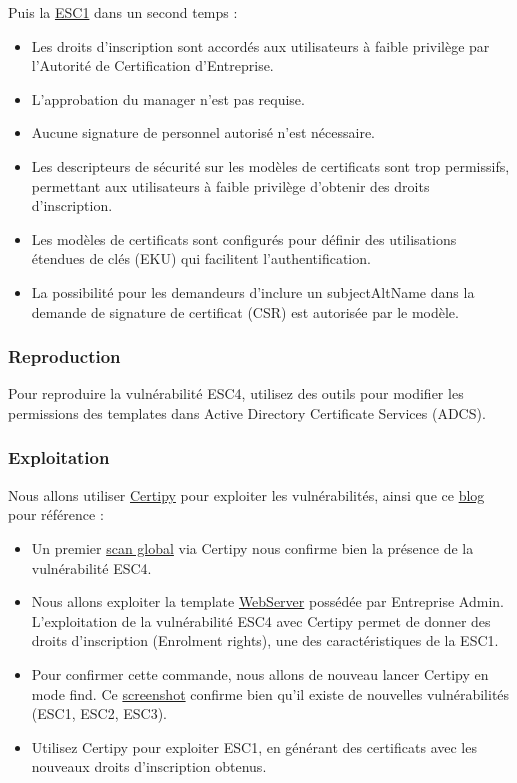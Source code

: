 \documentclass{article}
\begin{document}
Puis la \href{https://book.hacktricks.xyz/windows-hardening/active-directory-methodology/ad-certificates/domain-escalation}{ESC1} dans un second temps :
\begin{itemize}
    \item Les droits d'inscription sont accordés aux utilisateurs à faible privilège par l'Autorité de Certification d'Entreprise.
    \item L'approbation du manager n'est pas requise.
    \item Aucune signature de personnel autorisé n'est nécessaire.
    \item Les descripteurs de sécurité sur les modèles de certificats sont trop permissifs, permettant aux utilisateurs à faible privilège d'obtenir des droits d'inscription.
    \item Les modèles de certificats sont configurés pour définir des utilisations étendues de clés (EKU) qui facilitent l'authentification.
    \item La possibilité pour les demandeurs d'inclure un subjectAltName dans la demande de signature de certificat (CSR) est autorisée par le modèle.
\end{itemize}

\subsubsection{Reproduction}
Pour reproduire la vulnérabilité ESC4, utilisez des outils pour modifier les permissions des templates dans Active Directory Certificate Services (ADCS).

\subsubsection{Exploitation}
Nous allons utiliser \href{https://github.com/ly4k/Certipy}{Certipy} pour exploiter les vulnérabilités, ainsi que ce \href{https://www.beyondtrust.com/blog/entry/esc4-attacks}{blog} pour référence :
\begin{itemize}
    \item Un premier \href{https://github.com/MikeHorn-git/ADSecOps/blob/main/assets/text/certipy_recon.txt}{scan global} via Certipy nous confirme bien la présence de la vulnérabilité ESC4.
    \item Nous allons exploiter la template \href{https://github.com/MikeHorn-git/ADSecOps/blob/main/assets/text/certipy_webserver.txt}{WebServer} possédée par Entreprise Admin. L'exploitation de la vulnérabilité ESC4 avec Certipy permet de donner des droits d'inscription (Enrolment rights), une des caractéristiques de la ESC1.
    \item Pour confirmer cette commande, nous allons de nouveau lancer Certipy en mode find. Ce \href{https://github.com/MikeHorn-git/ADSecOps/blob/main/assets/pictures/certipy_confirm.png}{screenshot} confirme bien qu'il existe de nouvelles vulnérabilités (ESC1, ESC2, ESC3).
    \item Utilisez Certipy pour exploiter ESC1, en générant des certificats avec les nouveaux droits d'inscription obtenus.
\end{itemize}
\end{document}

